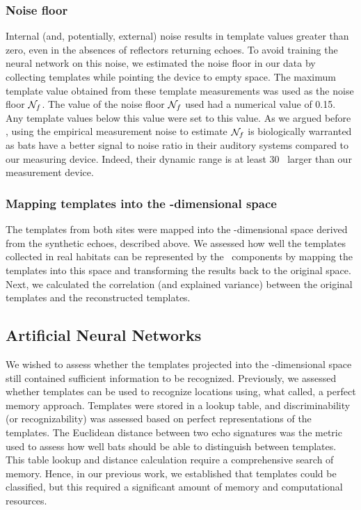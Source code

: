 \documentclass[preprint,5p]{elsarticle}
\begin{document}
\subsubsection{Noise floor}

Internal (and, potentially, external) noise results in template values greater than zero, even in the absences of reflectors returning echoes. To avoid training the neural network on this noise, we estimated the noise floor in our data by collecting templates while pointing the device to empty space. The maximum template value obtained from these template measurements was used as the noise floor $\mathcal{N}_f$. The value of the noise floor $\mathcal{N}_f$ used had a numerical value of 0.15. Any template values below this value were set to this value. As we argued before \citep{Vanderelst2016}, using the empirical measurement noise to estimate $\mathcal{N}_f$ is biologically warranted as bats have a better signal to noise ratio in their auditory systems compared to our measuring device. Indeed, their dynamic range is at least 30 \db\ larger than our measurement device.

\subsubsection{Mapping templates into the \pca-dimensional space}

The templates from both sites were mapped into the \pca-dimensional space derived from the synthetic echoes, described above. We assessed how well the templates collected in real habitats can be represented by the \pca\ components by mapping the templates into this space and transforming the results back to the original space. Next, we calculated the correlation (and explained variance) between the original templates and the reconstructed templates.

\subsection{Artificial Neural Networks}

We wished to assess whether the templates projected into the \pca-dimensional space still contained sufficient information to be recognized. Previously, we assessed whether templates can be used to recognize locations using, what \citet{Baddeley2012} called, a perfect memory approach. Templates were stored in a lookup table, and discriminability (or recognizability) was assessed based on perfect representations of the templates. The Euclidean distance between two echo signatures was the metric used to assess how well bats should be able to distinguish between templates. This table lookup and distance calculation require a comprehensive search of memory. Hence, in our previous work, we established that templates could be classified, but this required a significant amount of memory and computational resources.
\end{document}

